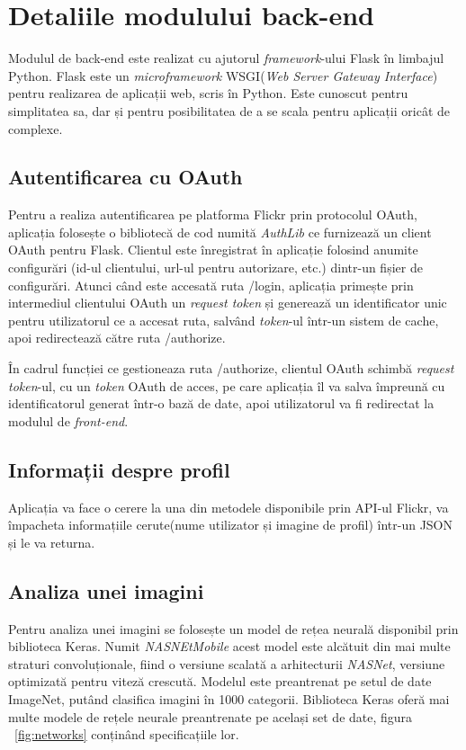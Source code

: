 \section{Detaliile modulului back-end}
Modulul de back-end este realizat cu ajutorul \textit{framework}-ului Flask în limbajul Python. Flask este un \textit{microframework} WSGI(\textit{Web Server Gateway Interface}) pentru realizarea de aplicații web, scris în Python. Este cunoscut pentru simplitatea sa, dar și pentru posibilitatea de a se scala pentru aplicații oricât de complexe.


\subsection{Autentificarea cu OAuth}
Pentru a realiza autentificarea pe platforma Flickr prin protocolul OAuth, aplicația folosește o bibliotecă de cod numită \textit{AuthLib} ce furnizează un client OAuth pentru Flask. Clientul este înregistrat în aplicație folosind anumite configurări (id-ul clientului, url-ul pentru autorizare, etc.) dintr-un fișier de configurări. Atunci când este accesată ruta /login, aplicația primește prin intermediul clientului OAuth un \textit{request token} și generează un identificator unic pentru utilizatorul ce a accesat ruta, salvând \textit{token}-ul într-un sistem de cache, apoi redirectează către ruta /authorize.

În cadrul funcției ce gestioneaza ruta /authorize, clientul OAuth schimbă \textit{request token}-ul, cu un \textit{token} OAuth de acces, pe care aplicația îl va salva împreună cu identificatorul generat într-o bază de date, apoi utilizatorul va fi redirectat la modulul de \textit{front-end}.

\subsection{Informații despre profil}
Aplicația va face o cerere la una din metodele disponibile prin API-ul Flickr, va împacheta informațiile cerute(nume utilizator și imagine de profil) într-un JSON și le va returna.

\subsection{Analiza unei imagini}
Pentru analiza unei imagini se folosește un model de rețea neurală disponibil prin biblioteca Keras. Numit \textit{NASNEtMobile} acest model este alcătuit din mai multe straturi convoluționale, fiind o versiune scalată a arhitecturii \textit{NASNet}, versiune optimizată pentru viteză crescută. Modelul este preantrenat pe setul de date ImageNet, putând clasifica imagini în 1000 categorii.
Biblioteca Keras oferă mai multe modele de rețele neurale preantrenate pe același set de date, figura ~\ref{fig:networks} conținând specificațiile lor.

